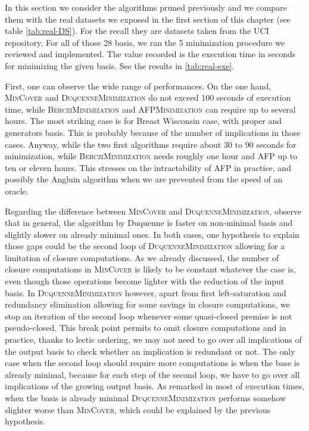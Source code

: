In this section we consider the algorithms pruned previously and we compare them
with the real datasets we exposed in the first section of this chapter (see table \ref{tab:real-DS}). For the recall they are datasets taken from the UCI 
repository. For all of those 28 basis, we ran the 5 minimization procedure
we reviewed and implemented. The value recorded is the execution time in seconds
for minimizing the given basis. See the results in \ref{tab:real-exe}.

\vspace{1.2em}

First, one can observe the wide range of performances. On the one hand,
\textsc{MinCover} and \textsc{DuquenneMinimization} do not exceed 100 seconds of execution time, while \textsc{BercziMinimization} and \textsc{AFPMinimization} can require up to several hours. The most striking
case is for Breast Wisconsin case, with proper and generators basis. This is
probably because of the number of implications in those cases. Anyway, while
the two first algorithms require about 30 to 90 seconds for minimization, while
\textsc{BercziMinimization} needs roughly one hour and \textsc{AFP} up to ten or eleven hours. This stresses on the intractability of \textsc{AFP} in practice, and possibly the Angluin algorithm when we are prevented from the speed of an oracle.

\vspace{1.2em}

Regarding the difference between \textsc{MinCover} and \textsc{DuquenneMinimization}, observe that in general, the algorithm by Duquenne is faster on non-minimal basis and slightly slower on already minimal ones. In both cases, one hypothesis to explain those gaps could be the second
loop of \textsc{DuquenneMinimization} allowing for a limitation of closure computations. As we already discussed, the number of closure computations in 
\textsc{MinCover} is likely to be constant whatever the case is, even though
those operations become lighter with the reduction of the input basis. In \textsc{DuquenneMinimization} however, apart from first left-saturation and
redundancy elimination allowing for some savings in closure computations, we stop an iteration of the second loop whenever some quasi-closed premise is not
pseudo-closed. This break point permits to omit closure computations and in practice, thanks to lectic ordering, we may not need to go over all implications of the output basis to check whether an implication is redundant or not. The only case when the second loop should require more computations is when the base is already minimal, because for each step of the second loop, we have to go over all implications of the growing output basis. As remarked in most of execution times, when the basis is already minimal \textsc{DuquenneMinimization} performs somehow slighter worse than 
\textsc{MinCover}, which could be explained by the previous hypothesis.

